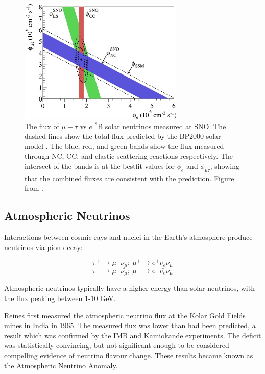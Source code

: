 \begin{figure}
\centering
\includegraphics*[width=0.7\textwidth,clip]{figs/snoresult}
\caption{The flux of $\mu+\tau$ vs $e$ $^8$B solar neutrinos measured at SNO. The dashed lines show the total flux predicted by the BP2000 solar model \cite{solmod}. The blue, red, and green bands show the flux measured through NC, CC, and elastic scattering reactions respectively. The intersect of the bands is at the bestfit values for $\phi_e$ and $\phi_{\mu\tau}$, showing that the combined fluxes are consistent with the prediction. Figure from \cite{snoresult}.} \label{fig:snores}
\end{figure}

\subsection{Atmospheric Neutrinos}\label{sec:atmosphericneutrinos}

Interactions between cosmic rays and nuclei in the Earth's atmosphere produce neutrinos via pion decay:

\begin{equation}
\pi^{+} \rightarrow \mu^{+}\nu_{\mu}; \medspace \mu^+ \rightarrow e^{+}\nu_{e}\nu_{\mu}
\end{equation}
\begin{equation}
\pi^- \rightarrow \mu^{-}\bar{\nu_{\mu}}; \medspace \mu^{-} \rightarrow e^{-}\bar{\nu_{e}}\nu_{\mu}
\end{equation}

Atmospheric neutrinos typically have a higher energy than solar neutrinos, with the flux peaking between 1-10 GeV.

Reines \cite{reines} first measured the atmospheric neutrino flux at the Kolar Gold Fields mines in India in 1965. The measured flux was lower than had been predicted, a result which was confirmed by the IMB \cite{imb} and Kamiokande \cite{kamiokande2} experiments. The deficit was statistically convincing, but not significant enough to be considered compelling evidence of neutrino flavour change. These results became known as the Atmospheric Neutrino Anomaly. 

